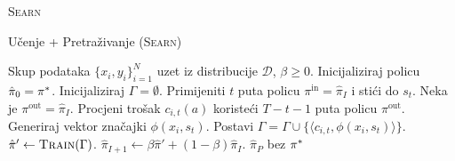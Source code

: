 \textsc{Searn}

\begin{algorithm}
\caption{Učenje + Pretraživanje (\textsc{Searn})}\label{alg:searn}
\begin{algorithmic}[1]
\Require Skup podataka $\{x_i, y_i\}_{i=1}^N$ uzet iz distribucije $\mathcal{D}$,
  $\beta \geq 0$. %
\State Inicijaliziraj policu $\hat{\pi}_0 = \pi\ssymbol{1}$.
\ForAll{$I \in \big[0,1,2,\ldots,P)$}
    \State Inicijaliziraj $\Gamma = \emptyset$. 
      \State Primijeniti $t$ puta policu $\pi^{\text{in}} = \hat{\pi}_{I}$  i stići do $s_t$. 
        \State Neka je  $\pi^{\text{out}} = \hat{\pi}_{I}$.
        \State Procjeni trošak $c_{i,t}(a)$ koristeći $T-t-1$ puta policu $\pi^{\text{out}}$. 
      \EndFor
      \State Generiraj vektor značajki $\phi(x_i, s_t)$.
      \State Postavi $\Gamma = \Gamma \cup \{\langle c_{i,t}, \phi(x_i, s_t) \rangle\}$.
    \EndFor
  \EndFor
  \State $\hat{\pi}' \gets \textsc{Train}(\Gamma)$.
  \State $\hat{\pi}_{I+1} \gets \beta \hat{\pi}' + (1-\beta) \hat{\pi}_{I}$.
\EndFor
\State \Return $\hat{\pi}_{P}$ bez $\pi\ssymbol{1}$
\end{algorithmic}
\end{algorithm}
